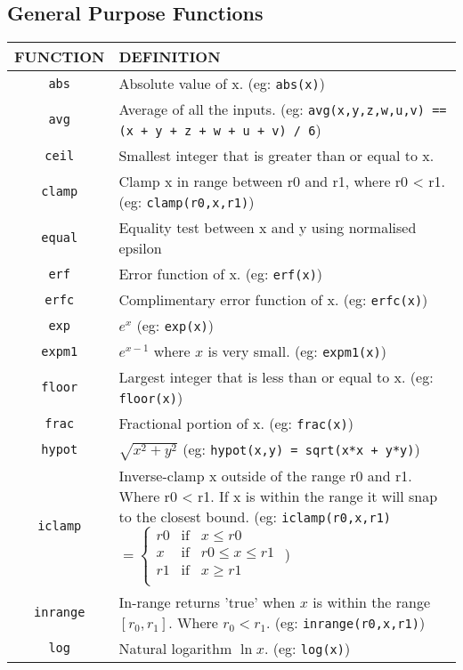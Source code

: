 \subsection{General Purpose Functions}

\begin{tabular}{|c|p{}|}
\hline
FUNCTION & DEFINITION\\
\hline
\verb'abs'& Absolute value of x.  (eg: \verb'abs(x)')\\
\verb'avg'& Average of all the inputs. (eg: \verb'avg(x,y,z,w,u,v) == (x + y + z + w + u + v) / 6')\\
\verb'ceil'& Smallest integer that is greater than or equal to x.\\
\verb'clamp'& Clamp x in range between r0 and r1, where r0 < r1. (eg:
\verb'clamp(r0,x,r1)')\\
\verb'equal'& Equality test between x and y using normalised epsilon\\
\verb'erf'& Error function of x.  (eg: \verb'erf(x)')\\
\verb'erfc'& Complimentary error function of x.  (eg: \verb'erfc(x)')\\
\verb'exp'& $e^x$  (eg: \verb'exp(x)')\\
\verb'expm1'& $e^{x-1}$ where $x$ is very small. (eg: \verb'expm1(x)')\\ 
\verb'floor'& Largest integer that is less than or equal to x. (eg: \verb'floor(x)')\\
\verb'frac'& Fractional portion of x.  (eg: \verb'frac(x)')\\
\verb'hypot'& $\sqrt{x^2+y^2}$ (eg: \verb'hypot(x,y) = sqrt(x*x + y*y)')\\
\verb'iclamp'& Inverse-clamp x outside of the range r0 and r1. Where
r0 < r1. If x is within the range it will snap to the closest
bound. (eg: \verb'iclamp(r0,x,r1)'
\begin{math}
=\left\{\begin{array}{ccc}
r0 & \mathrm{if} & x\le r0\\
x & \mathrm{if} & r0\le x \le r1\\
r1 & \mathrm{if} & x\ge r1\\
\end{array}\right.
\end{math}
)\\
\verb'inrange'&  In-range returns 'true' when $x$ is within the range $[r_0,r_1]$. Where $r_0 < r_1$.  (eg: \verb'inrange(r0,x,r1)')\\
\verb'log'& Natural logarithm $\ln x$.  (eg: \verb'log(x)')\\

\end{tabular}
